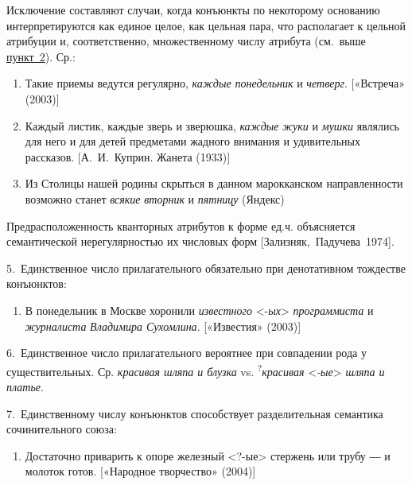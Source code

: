 Исключение составляют случаи, когда конъюнкты по некоторому основанию
интерпретируются как единое целое, как цельная пара, что располагает к
цельной атрибуции и, соответственно, множественному числу атрибута
(см.~выше \underline{пункт~2}). Ср.:

\begin{enumerate}
  \def\labelenumi{(\arabic{enumi})}
  \setcounter{enumi}{137}
  \item
        Такие приемы ведутся регулярно, \textit{каждые понедельник} и
        \textit{четверг}. {[}«Встреча» (2003){]}
  \item
        Каждый листик, каждые зверь и зверюшка, \textit{каждые} \textit{жуки} и
        \textit{мушки} являлись для него и для детей предметами жадного внимания
        и удивительных рассказов. {[}А.~И.~Куприн. Жанета (1933){]}
  \item
        Из Столицы нашей родины скрыться в данном марокканском направленности
        возможно станет \textit{всякие} \textit{вторник} и \textit{пятницу} (Яндекс)
\end{enumerate}

Предрасположенность кванторных атрибутов к форме ед.ч. объясняется
семантической нерегулярностью их числовых форм
{[}Зализняк,~Падучева~1974{]}.

5.~Единственное число прилагательного обязательно при денотативном
тождестве конъюнктов:

\begin{enumerate}
  \def\labelenumi{(\arabic{enumi})}
  \setcounter{enumi}{140}
  \item
        В понедельник в Москве хоронили \textit{известного}
        \textless*-\textit{ых}\textgreater{} \textit{программиста} и
        \textit{журналиста} \textit{Владимира Сухомлина}. {[}«Известия» (2003){]}
\end{enumerate}

6.~Единственное число прилагательного вероятнее при совпадении рода у
существительных. Ср. \textit{красивая шляпа и блузка} vs.
\textsuperscript{?}\textit{красивая} \textless{}\textit{-ые}\textgreater{}
\textit{шляпа и платье}.

7.~Единственному числу конъюнктов способствует разделительная семантика
сочинительного союза:

\begin{enumerate}
  \def\labelenumi{(\arabic{enumi})}
  \setcounter{enumi}{141}
  \item
        Достаточно приварить к опоре железный \textless?-ые\textgreater{}
        стержень или трубу ― и молоток готов. {[}«Народное творчество»
        (2004){]}
\end{enumerate}

